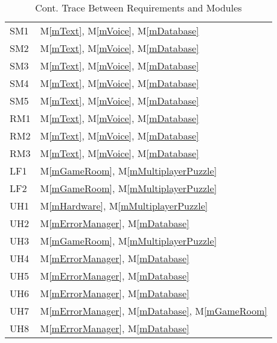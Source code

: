 \documentclass[12pt, titlepage]{article}
\newcommand{\mref}[1]{M\ref{#1}}
\begin{document}
\begin{table}[H]
\begin{tabular}{p{} p{}}
SM1 & \mref{mText}, \mref{mVoice}, \mref{mDatabase}\\
SM2 & \mref{mText}, \mref{mVoice}, \mref{mDatabase}\\
SM3 & \mref{mText}, \mref{mVoice}, \mref{mDatabase}\\
SM4 & \mref{mText}, \mref{mVoice}, \mref{mDatabase}\\
SM5 & \mref{mText}, \mref{mVoice}, \mref{mDatabase}\\
RM1 & \mref{mText}, \mref{mVoice}, \mref{mDatabase}\\
RM2 & \mref{mText}, \mref{mVoice}, \mref{mDatabase}\\
RM3 & \mref{mText}, \mref{mVoice}, \mref{mDatabase}\\
LF1 & \mref{mGameRoom}, \mref{mMultiplayerPuzzle}\\
LF2 & \mref{mGameRoom}, \mref{mMultiplayerPuzzle}\\
UH1 & \mref{mHardware}, \mref{mMultiplayerPuzzle}\\
UH2 & \mref{mErrorManager}, \mref{mDatabase}\\
UH3 & \mref{mGameRoom}, \mref{mMultiplayerPuzzle}\\
UH4 & \mref{mErrorManager}, \mref{mDatabase}\\
UH5 & \mref{mErrorManager}, \mref{mDatabase}\\
UH6 & \mref{mErrorManager}, \mref{mDatabase}\\
UH7 & \mref{mErrorManager}, \mref{mDatabase}, \mref{mGameRoom}\\
UH8 & \mref{mErrorManager}, \mref{mDatabase}\\


\bottomrule
\end{tabular}
\caption{Cont. Trace Between Requirements and Modules}
\label{TblRT2}
\end{table}
\end{document}
